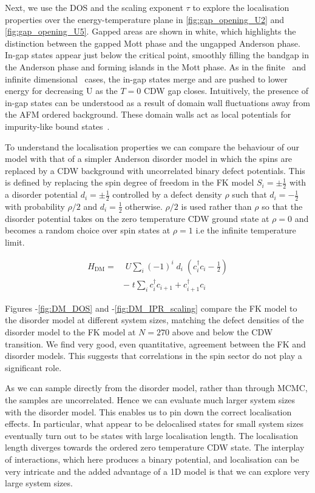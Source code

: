 Next, we use the DOS and the scaling exponent \(\tau\) to explore the localisation properties over the energy-temperature plane in \cref{fig:gap_opening_U2} and \cref{fig:gap_opening_U5}. Gapped areas are shown in white, which highlights the distinction between the gapped Mott phase and the ungapped Anderson phase. In-gap states appear just below the critical point, smoothly filling the bandgap in the Anderson phase and forming islands in the Mott phase. As in the finite~\autocite{zondaGaplessRegimeCharge2019} and infinite dimensional~\autocite{hassanSpectralPropertiesChargedensitywave2007} cases, the in-gap states merge and are pushed to lower energy for decreasing U as the \(T=0\) CDW gap closes. Intuitively, the presence of in-gap states can be understood as a result of domain wall fluctuations away from the AFM ordered background. These domain walls act as local potentials for impurity-like bound states~\autocite{zondaGaplessRegimeCharge2019}.

To understand the localisation properties we can compare the behaviour of our model with that of a simpler Anderson disorder model in which the spins are replaced by a CDW background with uncorrelated binary defect potentials. This is defined by replacing the spin degree of freedom in the FK model \(S_i = \pm \tfrac{1}{2}\) with a disorder potential \(d_i = \pm \tfrac{1}{2}\) controlled by a defect density \(\rho\) such that \(d_i = -\tfrac{1}{2}\) with probability \(\rho/2\) and \(d_i = \tfrac{1}{2}\) otherwise. \(\rho/2\) is used rather than \(\rho\) so that the disorder potential takes on the zero temperature CDW ground state at \(\rho = 0\) and becomes a random choice over spin states at \(\rho = 1\) i.e the infinite temperature limit.

\[\begin{aligned}
H_{\mathrm{DM}} = & \;U \sum_{i} (-1)^i \; d_i \;(c^\dagger_{i}c_{i} - \tfrac{1}{2}) \\
& -\;t \sum_{i} c^\dagger_{i}c_{i+1} + c^\dagger_{i+1}c_{i}
\end{aligned}\]

Figures -\cref{fig:DM_DOS} and -\cref{fig:DM_IPR_scaling} compare the FK model to the disorder model at different system sizes, matching the defect densities of the disorder model to the FK model at \(N = 270\) above and below the CDW transition. We find very good, even quantitative, agreement between the FK and disorder models. This suggests that correlations in the spin sector do not play a significant role.

As we can sample directly from the disorder model, rather than through MCMC, the samples are uncorrelated. Hence we can evaluate much larger system sizes with the disorder model. This enables us to pin down the correct localisation effects. In particular, what appear to be delocalised states for small system sizes eventually turn out to be states with large localisation length. The localisation length diverges towards the ordered zero temperature CDW state. The interplay of interactions, which here produces a binary potential, and localisation can be very intricate and the added advantage of a 1D model is that we can explore very large system sizes.

